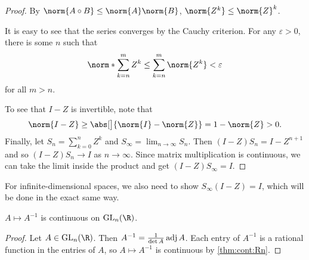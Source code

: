 \begin{proof}
    By $\norm{A \circ B} \le \norm{A} \norm{B}$,
    $\norm{Z^k} \le \norm{Z}^k$.

    It is easy to see that the series converges by the Cauchy criterion.
    For any $\varepsilon > 0$, there is some $n$ such that
    \[
        \norm*{\sum_{k=n}^m Z^k} \le \sum_{k=n}^m \norm{Z^k} < \varepsilon
    \]
    for all $m > n$.

    To see that $I - Z$ is invertible, note that \[
        \norm{I - Z} \ge \abs[\big]{\norm{I} - \norm{Z}} = 1 - \norm{Z} > 0.
    \]
    Finally, let $S_n = \sum_{k=0}^n Z^k$ and
    $S_\infty = \lim_{n \to \infty} S_n$.
    Then $(I - Z)S_n = I - Z^{n+1}$ and so
    $(I - Z)S_n \to I$ as $n \to \infty$.
    Since matrix multiplication is continuous, we can take the limit
    inside the product and get $(I - Z)S_\infty = I$.
\end{proof}
\begin{remark}
    For infinite-dimensional spaces, we also need to show
    $S_\infty (I - Z) = I$, which will be done in the exact same way.
\end{remark}

\begin{proposition}
    $A \mapsto A^{-1}$ is continuous on $\GL_n(\R)$.
\end{proposition}
\begin{proof}
    Let $A \in \GL_n(\R)$.
    Then $A^{-1} = \frac1{\det A} \operatorname{adj} A$.
    Each entry of $A^{-1}$ is a rational function in the entries of $A$,
    so $A \mapsto A^{-1}$ is continuous by \cref{thm:cont:Rn}.
\end{proof}
